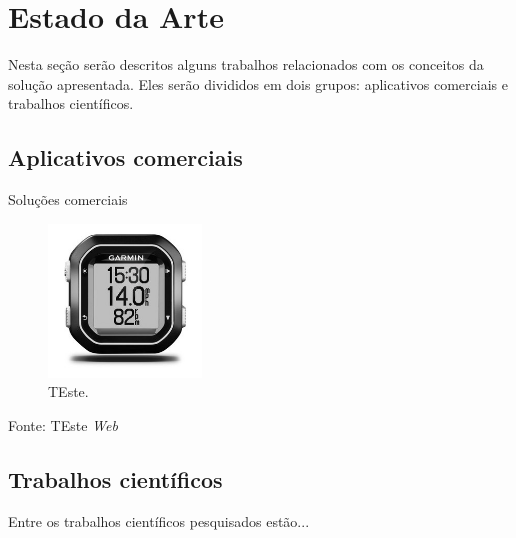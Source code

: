 \chapter{Estado da Arte} \label{cap:estadoarte}
Nesta seção serão descritos alguns trabalhos relacionados com os conceitos da solução apresentada. Eles serão divididos em dois grupos: aplicativos comerciais e trabalhos científicos.

\section{Aplicativos comerciais}
Soluções comerciais

\begin{figure}[h]
    \caption{TEste.}
    \centerline{\includegraphics[width=11em]{figuras/cf-lg.jpg}}
    \label{fig:garmin}
\end{figure}
\centerline{Fonte: TEste \textit{Web}}

\section{Trabalhos científicos}
Entre os trabalhos científicos pesquisados estão... \par

